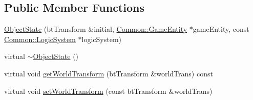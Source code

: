 \subsection*{Public Member Functions}
\begin{DoxyCompactItemize}
\item 
\hyperlink{class_collision_1_1_object_state_acd780ba908aac6389fc4b22a9257658a}{Object\+State} (bt\+Transform \&initial, \hyperlink{struct_common_1_1_game_entity}{Common\+::\+Game\+Entity} $\ast$game\+Entity, const \hyperlink{class_common_1_1_logic_system}{Common\+::\+Logic\+System} $\ast$logic\+System)
\item 
virtual \hyperlink{class_collision_1_1_object_state_a22a49e4cf7522a2b47fb128af6f65dc6}{$\sim$\+Object\+State} ()
\item 
virtual void \hyperlink{class_collision_1_1_object_state_a2bfa06b1f231cad379fbbd6a86cb9ac9}{get\+World\+Transform} (bt\+Transform \&world\+Trans) const
\item 
virtual void \hyperlink{class_collision_1_1_object_state_a7aeced5d3e1ae27eb7a31f2604ab227c}{set\+World\+Transform} (const bt\+Transform \&world\+Trans)
\end{DoxyCompactItemize}
